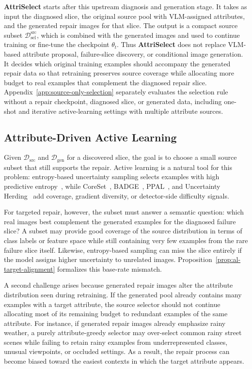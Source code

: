 \documentclass{article}
\newcommand{\modelname}{AttriSelect}
\newcommand{\model}{\textcolor{darkteal}{\textbf{\modelname}}\xspace}
\newcommand{\dataset}{\mathcal{D}}
\begin{document}
\model starts after this upstream diagnosis and generation stage. It takes as input the diagnosed slice, the original source pool with VLM-assigned attributes, and the generated repair images for that slice. The output is a compact source subset $\dataset_{\mathrm{sel}}^{\mathrm{src}}$, which is combined with the generated images and used to continue training or fine-tune the checkpoint $\theta_t$. Thus \model does not replace VLM-based attribute proposal, failure-slice discovery, or conditional image generation. It decides which original training examples should accompany the generated repair data so that retraining preserves source coverage while allocating more budget to real examples that complement the diagnosed repair slice. Appendix~\ref{app:source-only-selection} separately evaluates the selection rule without a repair checkpoint, diagnosed slice, or generated data, including one-shot and iterative active-learning settings with multiple attribute sources.

\subsection{Attribute-Driven Active Learning}

Given $\dataset_{\mathrm{src}}$ and $\dataset_{\mathrm{gen}}$ for a discovered slice, the goal is to choose a small source subset that still supports the repair. Active learning is a natural tool for this problem: entropy-based uncertainty sampling selects examples with high predictive entropy~\citep{settles2009active}, while CoreSet~\citep{sener2018active}, BADGE~\citep{ash2020deep}, PPAL~\citep{yang2024ppal}, and Uncertainty Herding~\citep{bae2025uncertainty} add coverage, gradient diversity, or detector-side difficulty signals.

For targeted repair, however, the subset must answer a semantic question: which real images best complement the generated examples for the diagnosed failure slice? A subset may provide good coverage of the source distribution in terms of class labels or feature space while still containing very few examples from the rare failure slice itself. Likewise, entropy-based sampling can miss the slice entirely if the model assigns higher uncertainty to unrelated images. Proposition~\ref{prop:al-target-alignment} formalizes this base-rate mismatch.

A second challenge arises because generated repair images alter the attribute distribution seen during retraining. If the generated pool already contains many examples with a target attribute, the source selector should not continue allocating most of its remaining budget to redundant examples of the same attribute. For instance, if generated repair images already emphasize rainy weather, a purely attribute-greedy selector may over-select common rainy street scenes while failing to retain rainy examples from underrepresented classes, unusual viewpoints, or occluded settings. As a result, the repair process can become biased toward the easiest contexts in which the target attribute appears.
\end{document}

